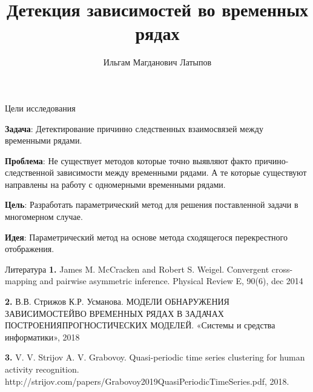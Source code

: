 \documentclass{beamer}
\title[\hbox to 56mm{Детекция зависимостей во временных рядах}]{Детекция зависимостей во временных рядах}
\author[И. М. Латыпов]{Ильгам Магданович Латыпов}
\institute[]{Московский физико-технический институт}
\date{\footnotesize
	\par\smallskip\emph{Курс:} Моя первая научная статья
	\par\smallskip\emph{Эксперт:} В. В. Стрижов
	\par\smallskip\emph{Консультант:} Э. Владимиров
	\par\bigskip\small 11\;апреля\;2023\,г.}
\begin{document}
	
	\begin{frame}
		
		\maketitle
		
	\end{frame}
	
	
	\begin{frame}{Цели исследования}
		
		\textbf{Задача}: Детектирование причинно следственных взаимосвязей между временными рядами.
		
		\textbf{Проблема}: Не существует методов которые точно выявляют факто причино-следственной зависимости между временными рядами. А те которые существуют направлены на работу с одномерными временными рядами.
		
		\bigskip
		
		\textbf{Цель}: Разработать параметрический метод для решения поставленной задачи в многомерном случае.
		
		\bigskip
		\textbf{Идея}: Параметрический метод на основе метода сходящегося перекрестного отображения.
	\end{frame}
	
	
	\begin{frame}{Литература}
		\textbf{1.} James M. McCracken and Robert S. Weigel. Convergent cross-mapping and pairwise
		asymmetric inference. Physical Review E, 90(6), dec 2014
		
		\textbf{2.} В.В. Стрижов К.Р. Усманова. МОДЕЛИ ОБНАРУЖЕНИЯ ЗАВИСИМОСТЕЙВО
		ВРЕМЕННЫХ РЯДАХ В ЗАДАЧАХ ПОСТРОЕНИЯПРОГНОСТИЧЕСКИХ МОДЕЛЕЙ. «Системы и средства информатики», 2018
		
		\textbf{3.} V. V. Strijov A. V. Grabovoy. Quasi-periodic time series clustering for human activity recognition. http://strijov.com/papers/Grabovoy2019QuasiPeriodicTimeSeries.pdf, 2018.
		
	\end{frame}
	
	
\end{document}
